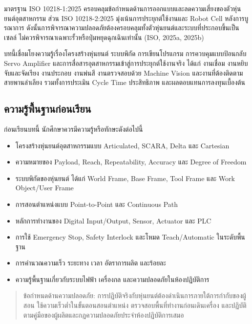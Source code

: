 มาตรฐาน ISO 10218-1:2025 ครอบคลุมข้อกำหนดด้านการออกแบบและลดความเสี่ยงของตัวหุ่นยนต์อุตสาหกรรม ส่วน ISO 10218-2:2025 มุ่งเน้นการประยุกต์ใช้งานและ Robot Cell หลังการบูรณาการ ดังนั้นการพิจารณาความปลอดภัยต้องครอบคลุมทั้งตัวหุ่นยนต์และระบบที่ประกอบขึ้นเป็นเซลล์ ไม่ควรพิจารณาเฉพาะรั้วหรือปุ่มหยุดฉุกเฉินเท่านั้น (ISO, 2025a, 2025b)

บทนี้เชื่อมโยงความรู้เรื่องโครงสร้างหุ่นยนต์ ระบบพิกัด การเขียนโปรแกรม การควบคุมแบบป้อนกลับ Servo Amplifier และการสื่อสารอุตสาหกรรมเข้าสู่การประยุกต์ใช้งานจริง ได้แก่ งานเชื่อม งานหยิบจับและจัดเรียง งานประกอบ งานพ่นสี งานตรวจสอบด้วย Machine Vision และงานที่ต้องติดตามสายพานลำเลียง รวมทั้งการประเมิน Cycle Time ประสิทธิภาพ และผลตอบแทนการลงทุนเบื้องต้น



\subsection{ความรู้พื้นฐานก่อนเรียน}

ก่อนเรียนบทนี้ นักศึกษาควรมีความรู้หรือทักษะดังต่อไปนี้

\begin{itemize}
    \item โครงสร้างหุ่นยนต์อุตสาหกรรมแบบ Articulated, SCARA, Delta และ Cartesian
    \item ความหมายของ Payload, Reach, Repeatability, Accuracy และ Degree of Freedom
    \item ระบบพิกัดของหุ่นยนต์ ได้แก่ World Frame, Base Frame, Tool Frame และ Work Object/User Frame
    \item การสอนตำแหน่งแบบ Point-to-Point และ Continuous Path
    \item หลักการทำงานของ Digital Input/Output, Sensor, Actuator และ PLC
    \item การใช้ Emergency Stop, Safety Interlock และโหมด Teach/Automatic ในระดับพื้นฐาน
    \item การคำนวณความเร็ว ระยะทาง เวลา อัตราการผลิต และร้อยละ
    \item ความรู้พื้นฐานเกี่ยวกับระบบไฟฟ้า เครื่องกล และความปลอดภัยในห้องปฏิบัติการ
\end{itemize}

\begin{quote}
ข้อกำหนดด้านความปลอดภัย: การปฏิบัติจริงกับหุ่นยนต์ต้องดำเนินการภายใต้การกำกับของผู้สอน ใช้ความเร็วต่ำในขั้นตอนสอนตำแหน่ง ตรวจสอบพื้นที่ทำงานก่อนเดินเครื่อง และปฏิบัติตามคู่มือของผู้ผลิตและกฎความปลอดภัยประจำห้องปฏิบัติการเสมอ
\end{quote}



